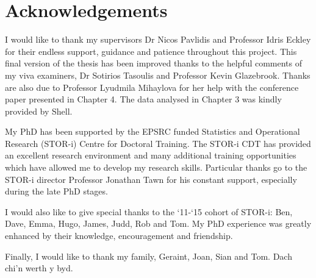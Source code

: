 %							

%								

\chapter*{Acknowledgements}

I would like to thank my supervisors Dr Nicos Pavlidis and Professor Idris Eckley for their endless support, guidance and patience throughout this project. This final version of the thesis has been improved thanks to the helpful comments of my viva examiners, Dr Sotirios Tasoulis and Professor Kevin Glazebrook. Thanks are also due to Professor Lyudmila Mihaylova for her help with the conference paper presented in Chapter 4. The data analysed in Chapter 3 was kindly provided by Shell.


My PhD has been supported by the EPSRC funded Statistics and Operational Research (STOR-i) Centre for Doctoral Training. The STOR-i CDT has provided an excellent research environment and many additional training opportunities which have allowed me to develop my research skills.  Particular thanks go to the STOR-i director Professor Jonathan Tawn for his constant support, especially during the late PhD stages. 

I would also like to give special thanks  to the `11-`15 cohort of STOR-i: Ben, Dave, Emma, Hugo, James, Judd, Rob and Tom. My PhD experience was greatly enhanced by their knowledge, encouragement and friendship.  

Finally, I would like to thank my family, Geraint, Joan, Sian and Tom. Dach chi'n werth y byd. 

